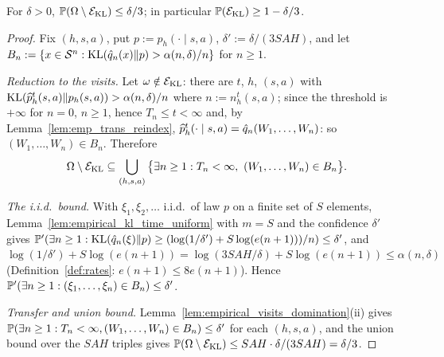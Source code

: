 \begin{lemma}\label{lem:event_kl_prob}
\leanok
{}
For $\delta > 0$, $\mathbb{P}(\Omega \setminus \mathcal{E}_{\mathrm{KL}}) \le \delta/3$; in particular $\mathbb{P}(\mathcal{E}_{\mathrm{KL}}) \ge 1 - \delta/3$.
\end{lemma}

\begin{proof}
\leanok
Fix $(h, s, a)$, put $p := p_h(\cdot \mid s, a)$, $\delta' := \delta/(3SAH)$, and let
$B_n := \{x \in \mathcal{S}^n : \mathrm{KL}(\hat q_n(x) \| p) > \alpha(n, \delta)/n\}$ for $n \ge 1$.

\emph{Reduction to the visits.} Let $\omega \notin \mathcal{E}_{\mathrm{KL}}$: there are $t$, $h$, $(s, a)$ with
$\mathrm{KL}(\widehat{p}_h^t(s, a) \| p_h(s, a)) > \alpha(n, \delta)/n$ where $n := n_h^t(s, a)$; since the threshold is
$+\infty$ for $n = 0$, $n \ge 1$, hence $T_n \le t < \infty$ and, by Lemma~\ref{lem:emp_trans_reindex},
$\widehat{p}_h^t(\cdot \mid s, a) = \hat q_n(W_1, \dots, W_n)$: so $(W_1, \dots, W_n) \in B_n$. Therefore
\[
  \Omega \setminus \mathcal{E}_{\mathrm{KL}} \subseteq \bigcup_{(h, s, a)} \big\{\exists n \ge 1 : T_n < \infty,\ (W_1, \dots, W_n) \in B_n\big\} .
\]

\emph{The i.i.d.\ bound.} With $\xi_1, \xi_2, \dots$ i.i.d.\ of law $p$ on a finite set of $S$
elements, Lemma~\ref{lem:empirical_kl_time_uniform} with $m = S$ and the confidence $\delta'$
gives $\mathbb{P}'(\exists n \ge 1 : \mathrm{KL}(\hat q_n(\xi) \| p) \ge (\log(1/\delta') + S\log(e(n + 1)))/n) \le \delta'$,
and $\log(1/\delta') + S\log(e(n + 1)) = \log(3SAH/\delta) + S \log(e(n + 1)) \le \alpha(n, \delta)$
(Definition~\ref{def:rates}: $e(n + 1) \le 8e(n + 1)$). Hence
$\mathbb{P}'(\exists n \ge 1 : (\xi_1, \dots, \xi_n) \in B_n) \le \delta'$.

\emph{Transfer and union bound.} Lemma~\ref{lem:empirical_visits_domination}(ii) gives
$\mathbb{P}(\exists n \ge 1 : T_n < \infty, (W_1, \dots, W_n) \in B_n) \le \delta'$ for each $(h, s, a)$, and
the union bound over the $SAH$ triples gives
$\mathbb{P}(\Omega \setminus \mathcal{E}_{\mathrm{KL}}) \le SAH \cdot \delta/(3SAH) = \delta/3$.
\end{proof}

